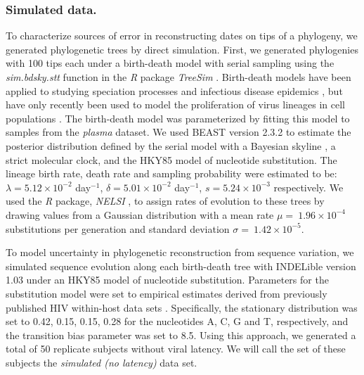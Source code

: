 \documentclass[12pt]{article}
\begin{document}
\subsubsection * {Simulated data.} \label{subsec:simdata}


To characterize sources of error in reconstructing dates on tips of a phylogeny, we generated phylogenetic trees by direct simulation. %
First, we generated phylogenies with 100 tips each under a birth-death model with serial sampling using the \emph{sim.bdsky.stt} function in the \textit{R} package \textit{TreeSim} \citep{Boskova14}.
Birth-death models have been applied to studying speciation processes \citep{Nee:2006} and infectious disease epidemics \citep{Stradler13}, but have only recently been used to model the proliferation of virus lineages in cell populations \citep{Hartfield:2015}.
The birth-death model was parameterized by fitting this model to samples from the {\em plasma} dataset.
We used BEAST version 2.3.2 to estimate the posterior distribution defined by the serial model with a Bayesian skyline \citep{Stadler13}, a strict molecular clock, and the HKY85 \citep{HKY85} model of nucleotide substitution.
The lineage birth rate, death rate and sampling probability were estimated to be: $\lambda = 5.12 \times 10^{-2}$ day$^{-1}$, $\delta = 5.01 \times 10^{-2}$ day$^{-1}$, $s = 5.24 \times 10^{-3}$ respectively.
We used the \textit{R} package, \emph{NELSI} \citep{NELSI}, to assign rates of evolution to these trees by drawing values from a Gaussian distribution with a mean rate $\mu = \ 1.96\times 10^{-4}$ substitutions per generation and standard deviation $\sigma = \ 1.42\times 10^{-5}$. %

To model uncertainty in phylogenetic reconstruction from sequence variation, we simulated sequence evolution along each birth-death tree with INDELible version 1.03 \citep{Indelible09} under an HKY85 \citep{HKY85} model of nucleotide substitution.
Parameters for the substitution model were set to empirical estimates derived from previously published HIV within-host data sets \citep{McCloskey14}. 
Specifically, the stationary distribution was set to 0.42, 0.15, 0.15, 0.28 for the nucleotides A, C, G and T, respectively, and the transition bias parameter was set to 8.5.
Using this approach, we generated a total of 50 replicate subjects without viral latency.
We will call the set of these subjects the \emph{simulated (no latency)} data set.
\end{document}
